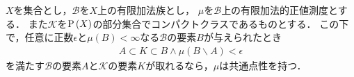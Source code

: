 		\begin{screen}
			\begin{thm}[測度有限な集合がコンパクトクラスで近似されるなら共通点性を持つ]
			\label{thm:finite_intersection_property_and_common_point_property}
				$X$を集合とし，$\mathcal{B}$を$X$上の有限加法族とし，
				$\mu$を$\mathcal{B}$上の有限加法的正値測度とする．
				また$\mathcal{K}$を$\operatorname*{P} \left(X\right)$の部分集合でコンパクトクラスであるものとする．
				この下で，任意に正数$\epsilon$と$\mu(B) < \infty$なる$\mathcal{B}$の要素$B$が与えられたとき
				\begin{align}
					A \subset K \subset B \wedge \mu(B \backslash A )< \epsilon
				\end{align}
				を満たす$\mathcal{B}$の要素$A$と$\mathcal{K}$の要素$K$が取れるなら，$\mu$は共通点性を持つ．
			\end{thm}
		\end{screen}
		
